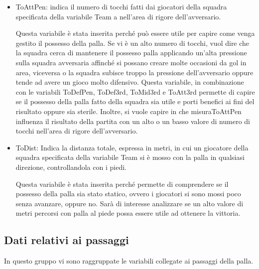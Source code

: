 \begin{itemize}
	\item \textsf{ToAttPen}: indica il numero di tocchi fatti dai giocatori della squadra specificata della variabile \textsf{Team} a nell'area di rigore dell'avversario. 
	
	Questa variabile è stata inserita perché può essere utile per capire come venga gestito il possesso della palla. Se vi è un alto numero di tocchi, vuol dire che la squadra cerca di mantenere il possesso palla applicando un'alta pressione sulla squadra avversaria affinché si possano creare molte occasioni da gol in area, viceversa o la squadra subisce troppo la pressione dell'avversario oppure tende ad avere un gioco molto difensivo. Questa variabile, in combinazione con le variabili \textsf{ToDefPen}, \textsf{ToDef3rd}, \textsf{ToMid3rd} e \textsf{ToAtt3rd} permette di capire se il possesso della palla fatto della squadra sia utile e porti benefici ai fini del risultato oppure sia sterile. Inoltre, si vuole capire in che misura\textsf{ToAttPen} influenza il risultato della partita con un alto o un basso valore di numero di tocchi nell'area di rigore dell'avversario.
	
	\item \textsf{ToDist}: Indica la distanza totale, espressa in metri, in cui un giocatore della squadra specificata della variabile \textsf{Team} si è mosso con la palla in qualsiasi direzione, controllandola con i piedi.
	
	Questa variabile è stata inserita perché permette di comprendere se il possesso della palla sia stato statico, ovvero i giocatori si sono mossi poco senza avanzare, oppure no. Sarà di interesse analizzare se un alto valore di metri percorsi con palla al piede possa essere utile ad ottenere la vittoria.
	
\end{itemize}

\subsection{Dati relativi ai passaggi}

In questo gruppo vi sono raggruppate le variabili collegate ai passaggi della palla.

